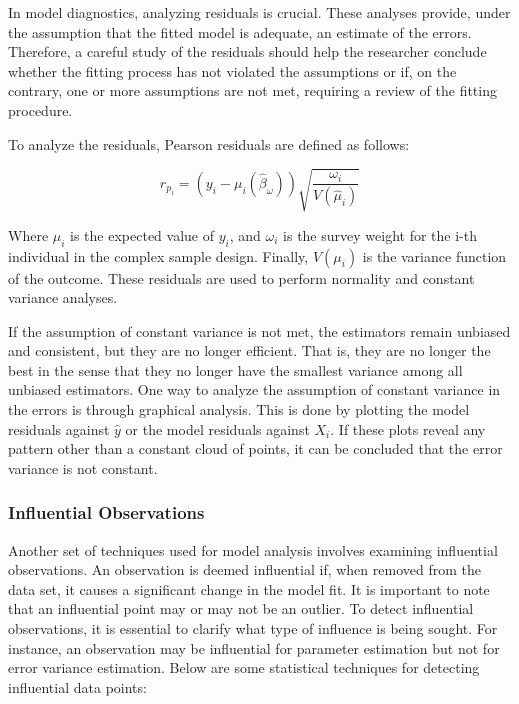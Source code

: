 \documentclass[
  12pt,
]{book}
\begin{document}
In model diagnostics, analyzing residuals is crucial. These analyses provide, under the assumption that the fitted model is adequate, an estimate of the errors. Therefore, a careful study of the residuals should help the researcher conclude whether the fitting process has not violated the assumptions or if, on the contrary, one or more assumptions are not met, requiring a review of the fitting procedure.

To analyze the residuals, Pearson residuals \citep{Heeringa_West_Berglund_2017} are defined as follows:

\[
r_{p_{i}}  =  \left(y_{i}-\mu_{i}\left(\hat{\beta}_{\omega}\right)\right)\sqrt{\frac{\omega_{i}}{V\left(\hat{\mu}_{i}\right)}}
\]

Where \(\mu_{i}\) is the expected value of \(y_{i}\), and \(\omega_{i}\) is the survey weight for the i-th individual in the complex sample design. Finally, \(V(\mu_{i})\) is the variance function of the outcome. These residuals are used to perform normality and constant variance analyses.

If the assumption of constant variance is not met, the estimators remain unbiased and consistent, but they are no longer efficient. That is, they are no longer the best in the sense that they no longer have the smallest variance among all unbiased estimators. One way to analyze the assumption of constant variance in the errors is through graphical analysis. This is done by plotting the model residuals against \(\hat{y}\) or the model residuals against \(X_{i}\). If these plots reveal any pattern other than a constant cloud of points, it can be concluded that the error variance is not constant.

\subsubsection{Influential Observations}\label{influential-observations}

Another set of techniques used for model analysis involves examining influential observations. An observation is deemed influential if, when removed from the data set, it causes a significant change in the model fit. It is important to note that an influential point may or may not be an outlier. To detect influential observations, it is essential to clarify what type of influence is being sought. For instance, an observation may be influential for parameter estimation but not for error variance estimation. Below are some statistical techniques for detecting influential data points:
\end{document}
